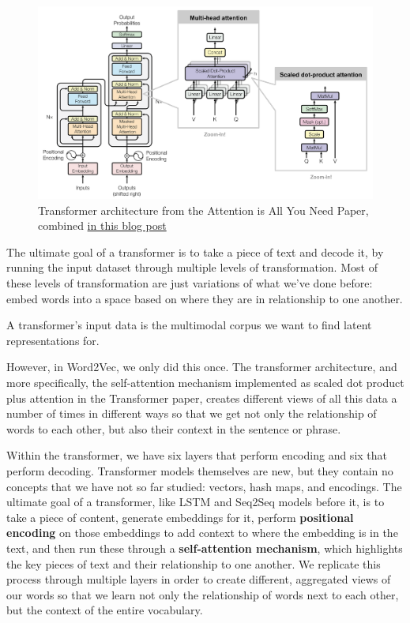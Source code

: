 \documentclass[11pt, table]{diazessay} %
\begin{document}
\begin{sloppypar}
\begin{figure}[H]
\centering
\includegraphics[width=.9\textwidth]{figures/transformer.png}
\caption{Transformer architecture from the Attention is All You Need Paper, combined  \href{https://lilianweng.github.io/posts/2018-06-24-attention/}{in this blog post }}
\end{figure}

The ultimate goal of a transformer is to take a piece of text and decode it, by running the input dataset through multiple levels of transformation. Most of these levels of transformation are just variations of what we've done before: embed words into a space based on where they are in relationship to one another. 

A transformer's input data is the multimodal corpus we want to find latent representations for. 

However, in Word2Vec, we only did this once. The transformer architecture, and more specifically, the self-attention mechanism implemented as scaled dot product plus attention in the Transformer paper, creates different views of all this data a number of times in different ways so that we get not only the relationship of words to each other, but also their context in the sentence or phrase.

Within the transformer, we have six layers that perform encoding and six that perform decoding.  Transformer models themselves are new, but they contain no concepts that we have not so far studied: vectors, hash maps, and encodings.  The ultimate goal of a transformer, like LSTM and Seq2Seq models before it, is to take a piece of content, generate embeddings for it, perform \textbf{positional encoding} on those embeddings to add context to where the embedding is in the text, and then run these through a \textbf{self-attention mechanism}, which highlights the key pieces of text and their relationship to one another. We replicate this process through multiple layers in order to create different, aggregated views of our words so that we learn not only the relationship of words next to each other, but the context of the entire vocabulary. 


\end{sloppypar}
\end{document}
